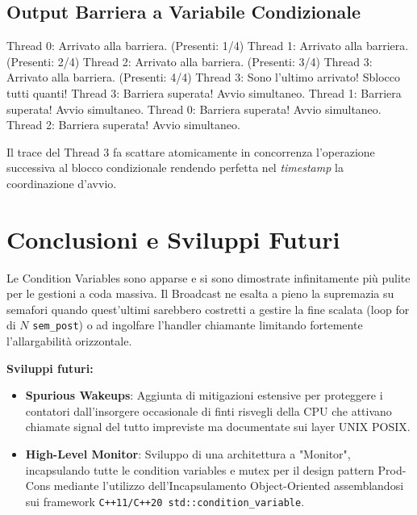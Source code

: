 \documentclass[a4paper,12pt]{article}
\begin{document}
\subsection{Output Barriera a Variabile Condizionale}
\begin{terminal}
Thread 0: Arrivato alla barriera. (Presenti: 1/4)
Thread 1: Arrivato alla barriera. (Presenti: 2/4)
Thread 2: Arrivato alla barriera. (Presenti: 3/4)
Thread 3: Arrivato alla barriera. (Presenti: 4/4)
Thread 3: Sono l'ultimo arrivato! Sblocco tutti quanti!
Thread 3: Barriera superata! Avvio simultaneo.
Thread 1: Barriera superata! Avvio simultaneo.
Thread 0: Barriera superata! Avvio simultaneo.
Thread 2: Barriera superata! Avvio simultaneo.
\end{terminal}
Il trace del Thread 3 fa scattare atomicamente in concorrenza l'operazione successiva al blocco condizionale rendendo perfetta nel \textit{timestamp} la coordinazione d'avvio.

\section{Conclusioni e Sviluppi Futuri}
Le Condition Variables sono apparse e si sono dimostrate infinitamente più pulite per le gestioni a coda massiva. Il Broadcast ne esalta a pieno la supremazia su semafori quando quest'ultimi sarebbero costretti a gestire la fine scalata (loop for di $N$ \texttt{sem\_post}) o ad ingolfare l'handler chiamante limitando fortemente l'allargabilità orizzontale. 

\noindent \textbf{Sviluppi futuri:}
\begin{itemize}
    \item \textbf{Spurious Wakeups}: Aggiunta di mitigazioni estensive per proteggere i contatori dall'insorgere occasionale di finti risvegli della CPU che attivano chiamate signal del tutto impreviste ma documentate sui layer UNIX POSIX.
    \item \textbf{High-Level Monitor}: Sviluppo di una architettura a "Monitor", incapsulando tutte le condition variables e mutex per il design pattern Prod-Cons mediante l'utilizzo dell'Incapsulamento Object-Oriented assemblandosi sui framework \texttt{C++11/C++20 std::condition\_variable}.
\end{itemize}
\end{document}
